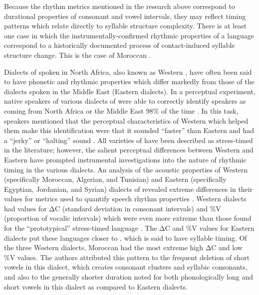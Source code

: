   Because the rhythm metrics mentioned in the research above correspond to durational properties of consonant and vowel intervals, they may reflect timing patterns which relate directly to syllable structure complexity. There is at least one case in which the instrumentally-confirmed rhythmic properties of a language correspond to a historically documented process of contact-induced syllable structure change. This is the case of Moroccan .

  Dialects of  spoken in North Africa, also known as Western , have often been said to have phonetic and rhythmic properties which differ markedly from those of the dialects spoken in the Middle East (Eastern  dialects). In a perceptual experiment, native speakers of various dialects of  were able to correctly identify  speakers as coming from North Africa or the Middle East 98\% of the time \citep{BarkatEtAl1999}. In this task, speakers mentioned that the perceptual characteristics of Western  which helped them make this identification were that it sounded “faster” than Eastern  and had a “jerky” or “halting” sound \citep{GhazaliEtAl2002}. All varieties of  have been described as stress-timed in the literature; however, the salient perceptual differences between Western and Eastern  have prompted instrumental investigations into the nature of rhythmic timing in the various dialects. An analysis of the acoustic properties of Western (specifically Moroccan, Algerian, and Tunisian) and Eastern (specifically Egyptian, Jordanian, and Syrian) dialects of  revealed extreme differences in their values for metrics used to quantify speech rhythm properties \citep{HamdiEtAl2004}. Western  dialects had values for ΔC (standard deviation in consonant intervals) and \%V (proportion of vocalic intervals) which were even more extreme than those found for the ``prototypical'' stress-timed language . The ΔC and \%V values for Eastern  dialects put these languages closer to , which is said to have syllable timing. Of the three Western  dialects, Moroccan  had the most extreme high ΔC and low \%V values. The authors attributed this pattern to the frequent deletion of short vowels in this dialect, which creates consonant clusters and syllabic consonants, and also to the generally shorter duration noted for both phonologically long and short vowels in this dialect as compared to Eastern  dialects.

